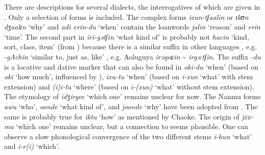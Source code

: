 There are descriptions for several  dialects, the interrogatives of which are given in . Only a selection of  forms is included. The complex forms \textit{ixun-tʃaalin} or \textit{ɪkʊn dʒaalɪn} ‘why’ and \textit{adi erin-du} ‘when’ contain the  loanwords \textit{jalin} ‘reason’ and \textit{erin} ‘time’. The second part in \textit{iri-}\textit{gətʃin} ‘what kind of’ is probably not  \textit{hacin} ‘kind, sort, class, item’ (from ) because there is a similar suffix in other  languages \citep[100]{Benzing1956}, e.g.  \textit{-gAchin} ‘similar to, just as, like’ \citep[56]{Nedjalkov1997}, e.g. Aoluguya  \textit{irəgeɕin} {\textasciitilde} \textit{irgəːtʃin}. The suffix \textit{-du} is a locative and dative  marker that can also be found in \textit{oki-du} ‘when’ (based on \textit{oki} ‘how much’, influenced by ), \textit{ixu-tu} ‘when’ (based on \textit{i-xun} ‘what’ with stem extension) and \textit{(i)i-tu} ‘where’ (based on \textit{i-(xun)} ‘what’ without stem extension). The etymology of \textit{idʒirgee} ‘which one’ remains unclear for now. The Nanmu forms \textit{awu} ‘who’, \textit{oonde} ‘what kind of’, and \textit{joonde} ‘why’ have been adopted from . The same is probably true for \textit{iktu} ‘how’ as mentioned by Chaoke. The origin of \textit{j\textsc{ee-}ma} ‘which one’ remains unclear, but a connection to  seems plausible. One can observe a slow phonological convergence of the two different stems \textit{i-hun} ‘what’ and \textit{i-r(i)} ‘which’.

